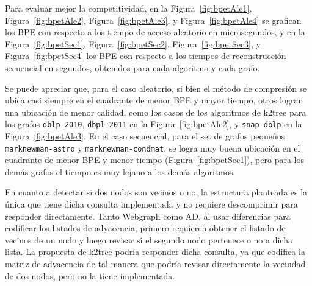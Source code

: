 Para evaluar mejor la competitividad, en la Figura~\ref{fig:bpetAle1}, Figura~\ref{fig:bpetAle2}, Figura~\ref{fig:bpetAle3}, y Figura~\ref{fig:bpetAle4} se grafican los BPE con respecto a los tiempo de acceso aleatorio en microsegundos, y en la Figura~\ref{fig:bpetSec1}, Figura~\ref{fig:bpetSec2}, Figura~\ref{fig:bpetSec3}, y Figura~\ref{fig:bpetSec4} los BPE con respecto a los tiempos de reconstrucción secuencial en segundos, obtenidos para cada algoritmo y cada grafo.

Se puede apreciar que, para el caso aleatorio, si bien el método de compresión se ubica casi siempre en el cuadrante de menor BPE y mayor tiempo, otros logran una ubicación de menor calidad, como los casos de los algoritmos de k2tree para los grafos \texttt{dblp-2010}, \texttt{dbpl-2011} en la Figura~\ref{fig:bpetAle2}, y \texttt{snap-dblp} en la Figura~\ref{fig:bpetAle3}. En el caso secuencial, para el set de grafos pequeños \texttt{marknewman-astro} y \texttt{marknewman-condmat}, se logra muy buena ubicación en el cuadrante de menor BPE y menor tiempo (Figura~\ref{fig:bpetSec1}), pero para los demás grafos el tiempo es muy lejano a los demás algoritmos. 

En cuanto a detectar si dos nodos son vecinos o no, la estructura planteada es la única que tiene dicha consulta implementada y no requiere descomprimir para responder directamente. Tanto Webgraph como AD, al usar diferencias para codificar los listados de adyacencia, primero requieren obtener el listado de vecinos de un nodo y luego revisar si el segundo nodo pertenece o no a dicha lista. La propuesta de k2tree podría responder dicha consulta, ya que codifica la matriz de adyacencia de tal manera que podría revisar directamente la vecindad de dos nodos, pero no la tiene implementada.

 
% 

%




%




